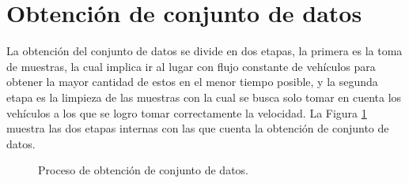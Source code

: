 \section{Obtención de conjunto de datos}


La obtención del conjunto de datos se divide en dos etapas, la primera es la toma de muestras, la cual implica ir al lugar con flujo constante de vehículos para obtener la mayor cantidad de estos en el menor tiempo posible, y la segunda etapa es la limpieza de las muestras con la cual se busca solo tomar en cuenta los vehículos a los que se logro tomar correctamente la velocidad.
La Figura \ref{fig:DFCreacionCD} muestra las dos etapas internas con las que cuenta la obtención de conjunto de datos.

\begin{figure}[H]
    \centering

    \caption{Proceso de obtención de conjunto de datos.}
    \label{fig:DFCreacionCD}
\end{figure}





